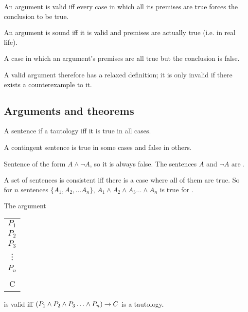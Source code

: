 \begin{definition}[Validity]
    An argument is valid iff every case in which all its premises are true forces the conclusion to be true.
\end{definition}

\begin{definition} [Soundness]
    An argument is sound iff it is valid and premises are actually true (i.e. in real life).
\end{definition}

\begin{definition}[Counterexample]
    A case in which an argument's premises are all true but the conclusion is false.
\end{definition}

A valid argument therefore has a relaxed definition; it is only invalid if there exists a counterexample to it.

\subsection{Arguments and theorems}

\begin{definition}[Tautology]
    A sentence if a tautology iff it is true in all cases.
\end{definition}

\begin{definition}[Contingent]
    A contingent sentence is true in some cases and false in others.
\end{definition}

\begin{definition}[Contradiction]
    Sentence of the form $A\land \lnot A$, so it is always false. The sentences $A$ and $\lnot A$ are .
\end{definition}

\begin{definition}[Consistent]
    A set of sentences is consistent iff there is a case where all of them are true. So for $n$ sentences $\{A_1,A_2,\ldots A_n\}$, $A_1\land A_2\land A_3\ldots \land A_n$ is true for .
\end{definition}

\begin{definition}
    The argument\\
    
    \begin{center}
        \begin{tabular}{c}
            $P_1$\\$P_2$\\$P_3$\\\vdots\\$P_n$\\\hline\\C
        \end{tabular}
    \end{center}

    is valid iff $(P_1\land P_2\land P_3\ldots \land P_n)\rightarrow C$ is a tautology.
\end{definition}

